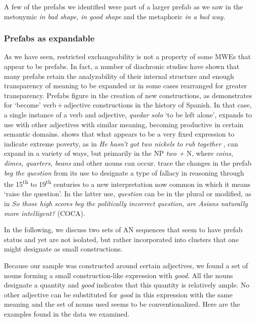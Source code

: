 \documentclass[output=paper]{langscibook}
\begin{document}
A few of the prefabs we identified were part of a larger prefab as we saw in the metonymic \textit{in bad shape, in good shape} and the metaphoric \textit{in a bad way.} 

\subsubsection{Prefabs as expandable}\label{sec:bybee:3.1.4}

As we have seen, restricted exchangeability is not a property of some MWEs that appear to be prefabs. In fact, a number of diachronic studies have shown that many prefabs retain the analyzability of their internal structure and enough transparency of meaning to be expanded or in some cases rearranged for greater transparency. Prefabs figure in the creation of new constructions, as \citet{Wilson2009} demonstrates for ‘become’ verb\,+\,adjective constructions in the history of Spanish. In that case, a single instance of a verb and adjective, \textit{quedar solo} ‘to be left alone’, expands to use with other adjectives with similar meaning, becoming productive in certain semantic domains. \citet{Bybee2014} shows that what appears to be a very fixed expression to indicate extreme poverty, as in \textit{He hasn't got two nickels to rub together} \citep{COHA1971}, can expand in a variety of ways, but primarily in the NP \textit{two +} N, where \textit{coins, dimes, quarters, beans} and other nouns can occur. \citet{BybeeModer2017} trace the changes in the prefab \textit{beg the question} from its use to designate a type of fallacy in reasoning through the 15\textsuperscript{th} to 19\textsuperscript{th} centuries to a new interpretation now common in which it means ‘raise the question’. In the latter use, \textit{question} can be in the plural or modified, as in \textit{So those high scores beg the politically incorrect question, are Asians naturally more intelligent?} (COCA). 

In the following, we discuss two sets of AN sequences that seem to have prefab status and yet are not isolated, but rather incorporated into clusters that one might designate as small constructions. 


Because our sample was constructed around certain adjectives, we found a set of nouns forming a small construction-like expression with \textit{good.} All the nouns designate a quantity and \textit{good} indicates that this quantity is relatively ample. No other adjective can be substituted for \textit{good} in this expression with the same meaning and the set of nouns used seems to be conventionalized. Here are the examples found in the data we examined.
\end{document}
